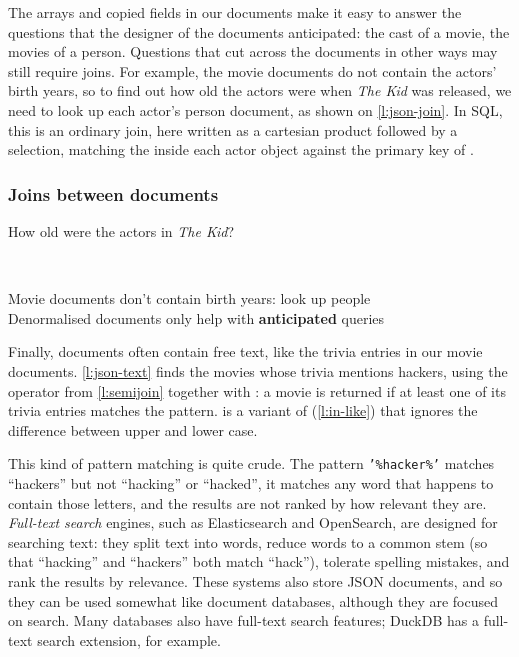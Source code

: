 The arrays and copied fields in our documents make it easy to answer the questions that the designer of the documents anticipated: the cast of a movie, the movies of a person.
Questions that cut across the documents in other ways may still require joins.
For example, the movie documents do not contain the actors' birth years, so to find out how old the actors were when \emph{The Kid} was released, we need to look up each actor's person document, as shown on \autoref{l:json-join}.
In SQL, this is an ordinary join, here written as a cartesian product followed by a selection, matching the  inside each actor object against the primary key of .

\begin{frame}
    \label{s:json-join}
    \frametitle{Joins between documents}
    How old were the actors in \emph{The Kid}?
    \inputminted[fontsize=\footnotesize]{sql}{code/json-join.sql}
    \vspace{0.3em}
    {\footnotesize}\\[0.8em]
    Movie documents don't contain birth years: look up people\\[0.4em]
    Denormalised documents only help with \textbf{anticipated} queries
\end{frame}
\label{l:json-join}

Finally, documents often contain free text, like the trivia entries in our movie documents.
\autoref{l:json-text} finds the movies whose trivia mentions hackers, using the  operator from \autoref{l:semijoin} together with : a movie is returned if at least one of its trivia entries matches the pattern.
 is a variant of  (\autoref{l:in-like}) that ignores the difference between upper and lower case.

This kind of pattern matching is quite crude.
The pattern \texttt{'\%hacker\%'} matches ``hackers'' but not ``hacking'' or ``hacked'', it matches any word that happens to contain those letters, and the results are not ranked by how relevant they are.
\emph{Full-text search} engines, such as Elasticsearch and OpenSearch, are designed for searching text: they split text into words, reduce words to a common stem (so that ``hacking'' and ``hackers'' both match ``hack''), tolerate spelling mistakes, and rank the results by relevance.
These systems also store JSON documents, and so they can be used somewhat like document databases, although they are focused on search.
Many databases also have full-text search features; DuckDB has a full-text search extension, for example.

